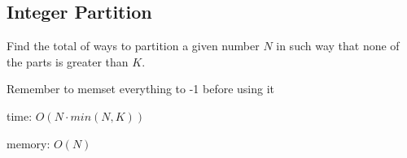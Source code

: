 \subsection{Integer Partition}

Find the total of ways to partition a given number $N$ in such way that none of the parts is greater than $K$.

Remember to memset everything to -1 before using it

time: $O(N \cdot min(N, K))$

memory: $O(N)$
